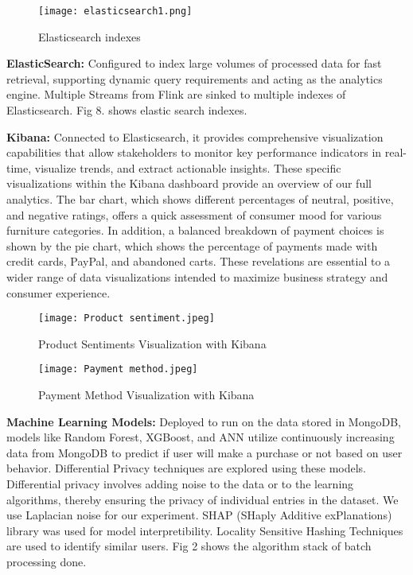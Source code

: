 \documentclass[conference]{IEEEtran}
\begin{document}
\begin{figure}[htbp]
\centerline{\texttt{[image: elasticsearch1.png]}}
\caption{Elasticsearch indexes}
\label{fig}
\end{figure}

\textbf{ElasticSearch:} Configured to index large volumes of processed data for fast retrieval, supporting dynamic query requirements and acting as the analytics engine. Multiple Streams from Flink are sinked to multiple indexes of Elasticsearch. Fig 8. shows elastic search indexes.

\textbf{Kibana:} Connected to Elasticsearch, it provides comprehensive visualization capabilities that allow stakeholders to monitor key performance indicators in real-time, visualize trends, and extract actionable insights. These specific visualizations within the Kibana dashboard provide an overview of our full analytics. The bar chart, which shows different percentages of neutral, positive, and negative ratings, offers a quick assessment of consumer mood for various furniture categories. In addition, a balanced breakdown of payment choices is shown by the pie chart, which shows the percentage of payments made with credit cards, PayPal, and abandoned carts. These revelations are essential to a wider range of data visualizations intended to maximize business strategy and consumer experience.

\begin{figure}[htbp]
\centerline{\texttt{[image: Product sentiment.jpeg]}}
\caption{Product Sentiments Visualization with Kibana}
\label{fig}
\end{figure}

\begin{figure}[htbp]
\centerline{\texttt{[image: Payment method.jpeg]}}
\caption{Payment Method Visualization with Kibana}
\label{fig}
\end{figure}

\textbf {Machine Learning Models:} Deployed to run on the data stored in MongoDB, models like Random Forest, XGBoost, and ANN utilize continuously increasing data from MongoDB to predict if user will make a purchase or not based on user behavior. Differential Privacy techniques are explored using these models. Differential privacy involves adding noise to the data or to the learning algorithms, thereby ensuring the privacy of individual entries in the dataset. We use Laplacian noise for our experiment. SHAP (SHaply Additive exPlanations) library was used for model interpretibility. Locality Sensitive Hashing Techniques are used to identify similar users. Fig 2 shows the algorithm stack of batch processing done.
\end{document}
